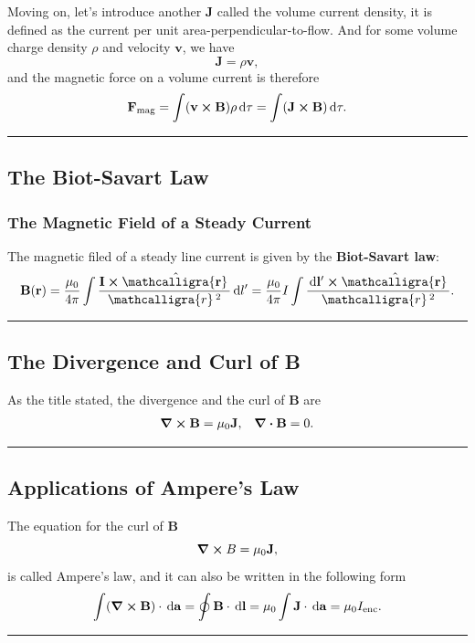 \documentclass[12pt,english]{article}
\newcommand{\dmr}[1]{\, \mathrm{d}#1} %
\numberwithin{equation}{subsection}
\newcommand{\curly}[1]{\ensuremath{\mathcalligra{#1}\,}}
\let\oldhat\hat
\renewcommand{\vec}[1]{\mathbf{#1}}
\renewcommand{\hat}[1]{\oldhat{\mathbf{#1}}}
\begin{document}
Moving on, let's introduce another $\vec{J}$ called the volume current density, it is defined as the current per unit area-perpendicular-to-flow. And for some volume charge density $\rho$ and velocity $\vec{v}$, we have
\begin{equation}
    \vec{J} = \rho \vec{v},
\end{equation}
and the magnetic force on a volume current is therefore
\begin{equation}
    \vec{F}_{\text{mag}} = \int (\vec{v}\cross\vec{B})\rho \dmr{\tau} = \int (\vec{J}\cross \vec{B})\dmr{\tau}.
\end{equation}
\par\noindent\rule{\textwidth}{0.4pt}
\subsection{The Biot-Savart Law}
\subsubsection{The Magnetic Field of a Steady Current}
The magnetic filed of a steady line current is given by the \textbf{Biot-Savart law}:
\begin{equation}
    \vec{B}(\vec{r}) = \frac{\mu_0}{4\pi}\int\frac{\vec{I}\cross\hat{\curly{r}}}{\curly{r}^2}\dmr{l'} = \frac{\mu_0}{4\pi}I\int \frac{\dmr{\vec{l'}}\cross\hat{\curly{r}}}{\curly{r}^2}.
\end{equation}
\par\noindent\rule{\textwidth}{0.4pt}

\subsection{The Divergence and Curl of B}
As the title stated, the divergence and the curl of $\vec{B}$ are
\begin{align*}
    \curl\vec{B} = \mu_0 \vec{J}, && \divergence \vec{B} =0.
\end{align*}


\par\noindent\rule{\textwidth}{0.4pt}
\subsection{Applications of Ampere's Law}
The equation for the curl of $\vec{B}$
\begin{equation}
    \curl B = \mu_0 \vec{J},
\end{equation}
is called Ampere's law, and it can also be written in the following form
\begin{equation}
    \int(\curl\vec{B})\cdot\dmr{\vec{a}} = \oint \vec{B} \cdot \dmr{\vec{l}} = \mu_0 \int \vec{J} \cdot \dmr{\vec{a}} = \mu_0 I_{\text{enc}}.
\end{equation}
\par\noindent\rule{\textwidth}{0.4pt}
\end{document}
